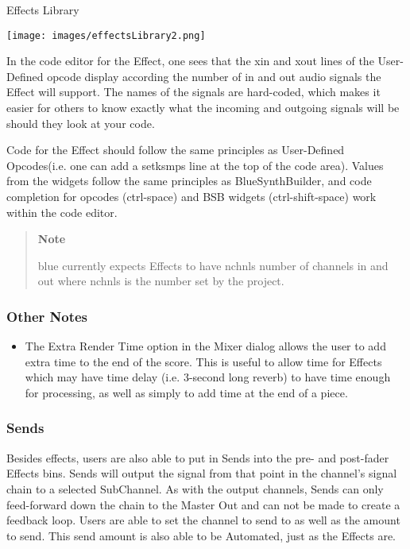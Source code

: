 Effects Library

\texttt{[image: images/effectsLibrary2.png]}

In the code editor for the Effect, one sees that the xin and xout lines
of the User-Defined opcode display according the number of in and out
audio signals the Effect will support. The names of the signals are
hard-coded, which makes it easier for others to know exactly what the
incoming and outgoing signals will be should they look at your code.

Code for the Effect should follow the same principles as User-Defined
Opcodes(i.e. one can add a setksmps line at the top of the code area).
Values from the widgets follow the same principles as BlueSynthBuilder,
and code completion for opcodes (ctrl-space) and BSB widgets
(ctrl-shift-space) work within the code editor.

\begin{quote}
\textbf{Note}

blue currently expects Effects to have nchnls number of channels in and
out where nchnls is the number set by the project.
\end{quote}

\subsubsection{Other Notes}

\begin{itemize}
\item
  The Extra Render Time option in the Mixer dialog allows the user to
  add extra time to the end of the score. This is useful to allow time
  for Effects which may have time delay (i.e. 3-second long reverb) to
  have time enough for processing, as well as simply to add time at the
  end of a piece.
\end{itemize}

\subsubsection{Sends}

Besides effects, users are also able to put in Sends into the pre- and
post-fader Effects bins. Sends will output the signal from that point in
the channel's signal chain to a selected SubChannel. As with the output
channels, Sends can only feed-forward down the chain to the Master Out
and can not be made to create a feedback loop. Users are able to set the
channel to send to as well as the amount to send. This send amount is
also able to be Automated, just as the Effects are.

